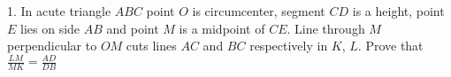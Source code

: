 1. In acute triangle $ABC$ point $O$ is circumcenter, segment $CD$ is a height, point $E$ lies on side $AB$ and point $M$ is a midpoint of $CE$. Line through $M$ perpendicular to $OM$ cuts lines $AC$ and $BC$ respectively in $K$, $L$. Prove that $\frac{LM}{MK}=\frac{AD}{DB}$